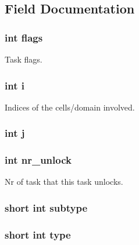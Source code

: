 \subsection{Field Documentation}
\hypertarget{structtask_ac8bf36fe0577cba66bccda3a6f7e80a4}{
\subsubsection[{flags}]{\setlength{\rightskip}{0pt plus 5cm}int flags}}\label{structtask_ac8bf36fe0577cba66bccda3a6f7e80a4}
Task flags. \hypertarget{structtask_acb559820d9ca11295b4500f179ef6392}{
\subsubsection[{i}]{\setlength{\rightskip}{0pt plus 5cm}int i}}\label{structtask_acb559820d9ca11295b4500f179ef6392}
Indices of the cells/domain involved. \hypertarget{structtask_a37d972ae0b47b9099e30983131d31916}{
\subsubsection[{j}]{\setlength{\rightskip}{0pt plus 5cm}int j}}\label{structtask_a37d972ae0b47b9099e30983131d31916}
\hypertarget{structtask_a060ca3576648f40a2488d5b81ff5bb8e}{
\subsubsection[{nr\-\_\-unlock}]{\setlength{\rightskip}{0pt plus 5cm}int nr\-\_\-unlock}}\label{structtask_a060ca3576648f40a2488d5b81ff5bb8e}
Nr of task that this task unlocks. \hypertarget{structtask_af211cd3d9a83521309369c8e3f3ed87d}{
\subsubsection[{subtype}]{\setlength{\rightskip}{0pt plus 5cm}short int subtype}}\label{structtask_af211cd3d9a83521309369c8e3f3ed87d}
\hypertarget{structtask_aaa8ba4297d83f2cce5af75b18564ae13}{
\subsubsection[{type}]{\setlength{\rightskip}{0pt plus 5cm}short int type}}\label{structtask_aaa8ba4297d83f2cce5af75b18564ae13}
